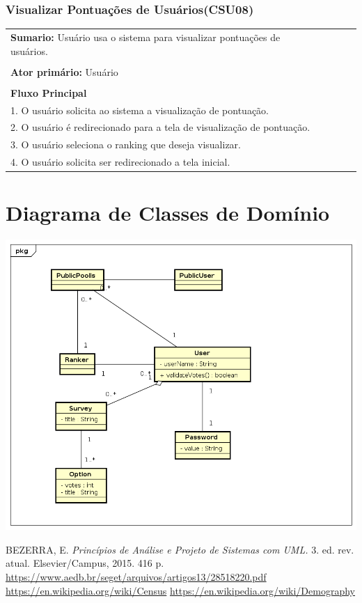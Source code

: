 \documentclass[a4paper,12pt]{article}
\begin{document}
\begin{center}
	{\subsubsection*{Visualizar Pontuações de Usuários(CSU08)}}
\end{center}
\markright{}
\begin{tabular}{|l|}\hline
	{\textbf{Sumario:}} Usuário usa o sistema para visualizar pontuações de usuários.\ \ \ \ \ \ \ \ \ \ \ \ \ \ \ \ \ \ \ \ \ \ \ \ \ \ \ \ \ \ \ \ \ \\\\
	{\textbf{Ator primário:}} Usuário \\\\
	{\textbf{Fluxo Principal}}\\
	1. O usuário solicita ao sistema a visualização de pontuação.\\
	2. O usuário é redirecionado para a tela de visualização de pontuação. \\
	3. O usuário seleciona o ranking que deseja visualizar. \\
	4. O usuário solicita ser redirecionado a tela inicial.\\
	\hline
\end{tabular}

\newpage
\section*{Diagrama de Classes de Domínio}
\markright{}
\includegraphics[width=15cm]{class_diagrams/ClassDiagram0.png}

\newpage
\begin{thebibliography}{9}
	BEZERRA, E.
	\textit{Princípios de Análise e Projeto de Sistemas com UML.}
	 3. ed. rev. atual.
	 Elsevier/Campus,
	 2015.
	 416 p.
	\url{https://www.aedb.br/seget/arquivos/artigos13/28518220.pdf}
	\url{https://en.wikipedia.org/wiki/Census}
	\url{https://en.wikipedia.org/wiki/Demography}
\end{thebibliography}
\markright{}
\end{document}
